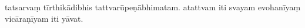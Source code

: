 \documentclass[12pt]{article}
\begin{document}
tatsarvaṃ tīrthikādibhis tattvarūpeṇābhimatam. atattvam iti svayam evohanīyaṃ vicāraṇīyam iti yāvat.

% 
% 
% 
\end{document}
